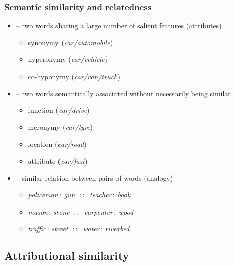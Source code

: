 \documentclass[t]{beamer} %
\begin{document}
\begin{frame}
\frametitle{Semantic similarity and relatedness}

\ungap[1]
\begin{itemize}
\item {} -- two words sharing a large number of salient features (attributes)
\begin{itemize}
\item synonymy (\emph{car/automobile})
\item hyperonymy (\emph{car/vehicle)}
\item co-hyponymy (\emph{car/van/truck})
\end{itemize}

\item<2->  \citep{Budanitsky:Hirst:06} -- two words semantically associated without necessarily being similar
\begin{itemize}
\item function (\emph{car/drive})
\item meronymy (\emph{car/tyre})
\item location (\emph{car/road})
\item attribute (\emph{car/fast})
\end{itemize}

\item<3->  \citep{Turney:06} -- similar relation between pairs of words (analogy)
  \begin{itemize}
  \item \emph{policeman}$\,:\,$\emph{gun} $\;::\;$ \emph{teacher}$\,:\,$\emph{book}
  \item \emph{mason}$\,:\,$\emph{stone} $\;::\;$ \emph{carpenter}$\,:\,$\emph{wood}
  \item \emph{traffic}$\,:\,$\emph{street} $\;::\;$ \emph{water}$\,:\,$\emph{riverbed}
  \end{itemize}
\end{itemize}
\end{frame}

\subsection{Attributional similarity}
\end{document}
